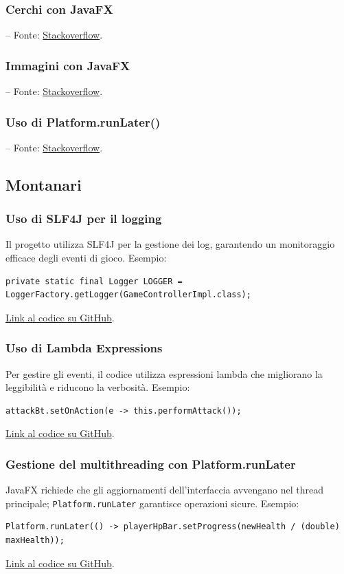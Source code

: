\documentclass[a4paper,12pt]{report}
\begin{document}
\subsubsection{Cerchi con JavaFX} – Fonte: \href{https://stackoverflow.com/questions/70876114/click-to-draw-a-shape-circle}{Stackoverflow}.
\subsubsection{Immagini con JavaFX} – Fonte: \href{https://stackoverflow.com/questions/52229984/javafx-imageview-actions}{Stackoverflow}.
\subsubsection{Uso di Platform.runLater()} – Fonte: \href{https://stackoverflow.com/questions/13784333/platform-runlater-and-task-in-javafx}{Stackoverflow}.

\subsection{Montanari}
\subsubsection{Uso di SLF4J per il logging}
Il progetto utilizza SLF4J per la gestione dei log, garantendo un monitoraggio efficace degli eventi di gioco.\newline
Esempio:
\begin{verbatim}
private static final Logger LOGGER = LoggerFactory.getLogger(GameControllerImpl.class);
\end{verbatim}
\href{https://github.com/}{Link al codice su GitHub}.

\subsubsection{Uso di Lambda Expressions}
Per gestire gli eventi, il codice utilizza espressioni lambda che migliorano la leggibilità e riducono la verbosità.\newline
Esempio:
\begin{verbatim}
attackBt.setOnAction(e -> this.performAttack());
\end{verbatim}
\href{https://github.com/}{Link al codice su GitHub}.

\subsubsection{Gestione del multithreading con Platform.runLater}
JavaFX richiede che gli aggiornamenti dell'interfaccia avvengano nel thread principale; \texttt{Platform.runLater} garantisce operazioni sicure.\newline
Esempio:
\begin{verbatim}
Platform.runLater(() -> playerHpBar.setProgress(newHealth / (double) maxHealth));
\end{verbatim}
\href{https://github.com/}{Link al codice su GitHub}.
\end{document}
